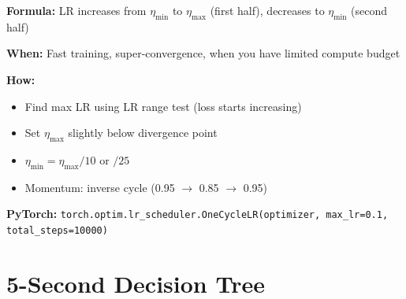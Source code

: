 \documentclass[../main.tex]{subfiles}
\begin{document}
\vspace{0.3cm}

\begin{tcolorbox}[colback=purple!3, colframe=purple!40, title={\textbf{One-Cycle Policy}}, fonttitle=\bfseries]
\textbf{Formula:} LR increases from $\eta_{\min}$ to $\eta_{\max}$ (first half), decreases to $\eta_{\min}$ (second half)

\textbf{When:} Fast training, super-convergence, when you have limited compute budget

\textbf{How:}
\begin{itemize}[leftmargin=*, itemsep=1pt]
    \item Find max LR using LR range test (loss starts increasing)
    \item Set $\eta_{\max}$ slightly below divergence point
    \item $\eta_{\min} = \eta_{\max} / 10$ or $/25$
    \item Momentum: inverse cycle (0.95 $\to$ 0.85 $\to$ 0.95)
\end{itemize}

\textbf{PyTorch:} \texttt{torch.optim.lr\_scheduler.OneCycleLR(optimizer, max\_lr=0.1, total\_steps=10000)}
\end{tcolorbox}

\section{5-Second Decision Tree}\label{sec:cheat-decision-tree}
\end{document}
